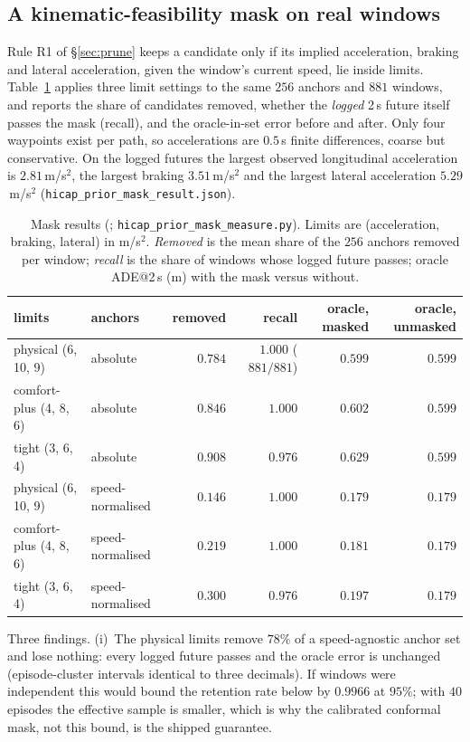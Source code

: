 \subsection{A kinematic-feasibility mask on real windows}
Rule R1 of \S\ref{sec:prune} keeps a candidate only if its implied acceleration, braking and lateral acceleration, given the window's current speed, lie inside limits. Table~\ref{tab:mask} applies three limit settings to the same $256$ anchors and $881$ windows, and reports the share of candidates removed, whether the \emph{logged} 2\,s future itself passes the mask (recall), and the oracle-in-set error before and after. Only four waypoints exist per path, so accelerations are $0.5$\,s finite differences, coarse but conservative.
On the logged futures the largest observed longitudinal acceleration is $2.81$\,m/s$^2$, the largest braking $3.51$\,m/s$^2$ and the largest lateral acceleration $5.29$\,m/s$^2$ (\texttt{hicap\_prior\_mask\_result.json}).
\begin{table}[h]
\centering\small
\caption{Mask results (\evM; \texttt{hicap\_prior\_mask\_measure.py}). Limits are (acceleration, braking, lateral) in m/s$^2$. \emph{Removed} is the mean share of the $256$ anchors removed per window; \emph{recall} is the share of windows whose logged future passes; oracle ADE@2\,s (m) with the mask versus without.}
\label{tab:mask}
\begin{tabular}{@{}llrrrr@{}}
\toprule
limits & anchors & removed & recall & oracle, masked & oracle, unmasked \\ \midrule
physical (6, 10, 9) & absolute & $0.784$ & $1.000$ ($881/881$) & $0.599$ & $0.599$ \\
comfort-plus (4, 8, 6) & absolute & $0.846$ & $1.000$ & $0.602$ & $0.599$ \\
tight (3, 6, 4) & absolute & $0.908$ & $0.976$ & $0.629$ & $0.599$ \\
\midrule
physical (6, 10, 9) & speed-normalised & $0.146$ & $1.000$ & $0.179$ & $0.179$ \\
comfort-plus (4, 8, 6) & speed-normalised & $0.219$ & $1.000$ & $0.181$ & $0.179$ \\
tight (3, 6, 4) & speed-normalised & $0.300$ & $0.976$ & $0.197$ & $0.179$ \\
\bottomrule
\end{tabular}
\end{table}
Three findings. (i)~The physical limits remove $78\%$ of a speed-agnostic anchor set and lose nothing: every logged future passes and the oracle error is unchanged (episode-cluster intervals identical to three decimals). If windows were independent this would bound the retention rate below by $0.9966$ at $95\%$; with $40$ episodes the effective sample is smaller, which is why the calibrated conformal mask, not this bound, is the shipped guarantee.
